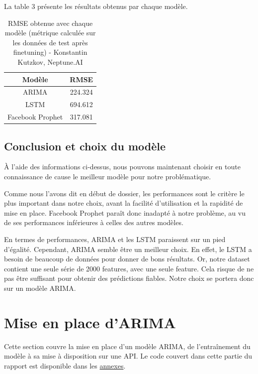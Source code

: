 \documentclass[french]{article}
\begin{document}
    La table 3 présente les résultats obtenus par chaque modèle.
    \begin{table}[h!]
        \begin{center}
            \begin{tabular}{ |c|c| }
                \hline
                Modèle & RMSE \\
                \hline
                ARIMA & 224.324 \\ 
                \hline
                LSTM & 694.612 \\  
                \hline
                Facebook Prophet & 317.081 \\
                \hline
            \end{tabular}
            \caption{RMSE obtenue avec chaque modèle (métrique calculée sur les données de test après finetuning) - Konstantin Kutzkov, Neptune.AI}
            \label{table:1}
        \end{center}
    \end{table}

    \subsection{Conclusion et choix du modèle}
    À l'aide des informations ci-dessus, nous pouvons maintenant choisir en toute connaissance de cause le meilleur modèle pour notre problématique.

    Comme nous l'avons dit en début de dossier, les performances sont le critère le plus important dans notre choix, avant la facilité d'utilisation et la rapidité de mise en place. Facebook Prophet paraît donc inadapté à notre problème, au vu de ses performances inférieures à celles des autres modèles.

    En termes de performances, ARIMA et les LSTM paraissent sur un pied d'égalité. Cependant, ARIMA semble être un meilleur choix. En effet, le LSTM a besoin de beaucoup de données pour donner de bons résultats. Or, notre dataset contient une seule série de 2000 features, avec une seule feature. Cela risque de ne pas être suffisant pour obtenir des prédictions fiables. Notre choix se portera donc sur un modèle ARIMA.
    
    \section{Mise en place d'ARIMA}

    Cette section couvre la mise en place d'un modèle ARIMA, de l'entraînement du modèle à sa mise à disposition sur une API. Le code couvert dans cette partie du rapport est disponible dans les \hyperref[sec:code]{annexes}.
\end{document}

